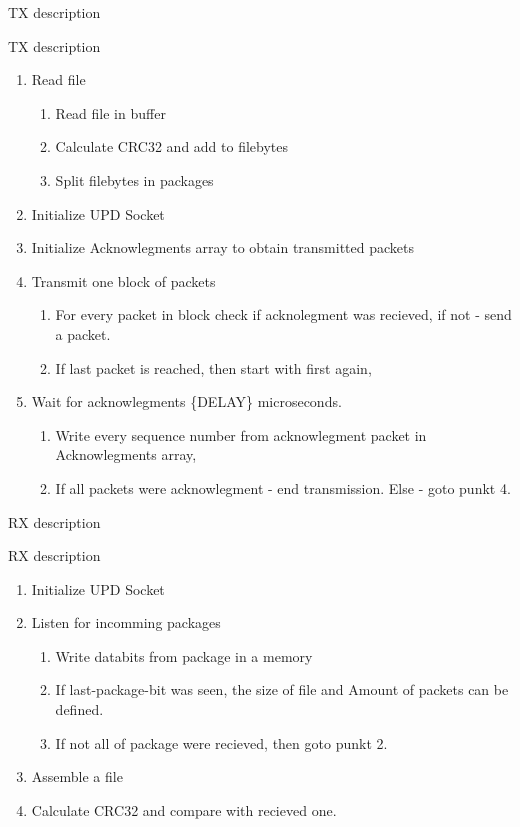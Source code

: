 \documentclass[10pt]{beamer}
\begin{document}
\begin{frame}[fragile]{TX description}
	\begin{block}{TX description}
		\begin{enumerate}
		\item Read file
		\begin{enumerate}
			\item Read file in buffer
			\item Calculate CRC32 and add to filebytes
			\item Split filebytes in packages
		\end{enumerate}
		\item Initialize UPD Socket
		\item Initialize Acknowlegments array to obtain transmitted packets
		\item Transmit one block of packets
		\begin{enumerate}
			\item For every packet in block check if acknolegment was recieved, if not - send a packet.
			\item If last packet is reached, then start with first again,
		\end{enumerate}
		\item Wait for acknowlegments \{DELAY\} microseconds.
		\begin{enumerate}
			\item Write every sequence number from acknowlegment packet in Acknowlegments array,
			\item If all packets were acknowlegment - end transmission. Else - goto punkt 4.
		\end{enumerate}
		\end{enumerate}
	\end{block}
\end{frame}




\begin{frame}[fragile]{RX description}
	\begin{block}{RX description}
		\begin{enumerate}
		\item Initialize UPD Socket
		\item Listen for incomming packages
		\begin{enumerate}
			\item Write databits from package in a memory
			\item If last-package-bit was seen, the size of file and Amount of packets can be defined.
			\item If not all of package were recieved, then goto punkt 2.
		\end{enumerate}
		\item Assemble a file
		\item Calculate CRC32 and compare with recieved one.
		\end{enumerate}
	\end{block}
\end{frame}
\end{document}

